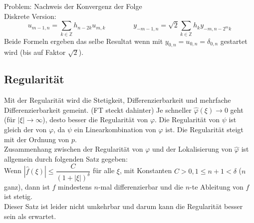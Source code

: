 Problem: Nachweis der Konvergenz der Folge\\

Diskrete Version:
\[ 
	u_{m-1,n} = \sum_{k \in \mathbb{Z}} h_{n-2k}u_{m,k}
	\qquad \qquad
	y_{-m-1,n}=\sqrt{2} \sum_{k \in \mathbb{Z}} h_k y_{-m,n-2^mk}
\]
Beide Formeln ergeben das selbe Resultat wenn mit $y_{0,n}=u_{0,n}=\delta_{0,n}$ gestartet wird (bis auf Faktor $\sqrt{2}$).


\subsection{Regularität}
Mit der Regularität wird  die Stetigkeit, Differenzierbarkeit und mehrfache Differenzierbarkeit gemeint. (FT steckt dahinter)
Je schneller $\hat{\varphi}(\xi) \rightarrow 0$ geht (für $|\xi| \rightarrow \infty$), desto besser die Regularität von $\varphi$. Die Regularität von $\psi$ ist gleich der von $\varphi$, da $\psi$ ein Linearkombination von $\varphi$ ist. Die Regularität steigt mit der Ordnung von $p$.\\

Zusammenhang zwischen der Regularität von $\varphi$ und der Lokalisierung von $\hat{\varphi}$ ist allgemein durch folgenden Satz gegeben:\\
Wenn $|\hat{f}(\xi)| \leq \dfrac{C}{(1+|\xi|)^\delta}$ für alle $\xi$, mit Konstanten $C>0, 1\leq n+1 < \delta$ ($n$ ganz), dann ist $f$ mindestens $n$-mal differenzierbar und die $n$-te Ableitung von $f$ ist stetig.\\

Dieser Satz ist leider nicht umkehrbar und darum kann die Regularität besser sein als erwartet.
